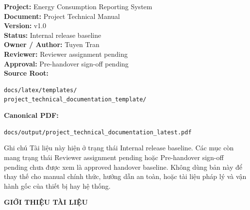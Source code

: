 \documentclass[12pt,oneside,openany]{book}
\numberwithin{equation}{chapter}
\newcommand{\ProjectName}{Energy Consumption Reporting System}
\newcommand{\DocumentShortTitle}{Project Technical Manual}
\newcommand{\DocumentVersionLabel}{v1.0}
\newcommand{\DocumentStatusLabel}{Internal release baseline}
\newcommand{\DocumentOwnerLabel}{Tuyen Tran}
\newcommand{\DocumentReviewerLabel}{Reviewer assignment pending}
\newcommand{\DocumentApprovalLabel}{Pre-handover sign-off pending}
\newcommand{\DocumentOutputPathDisplay}{\nolinkurl{docs/output/project_technical_documentation_latest.pdf}}
\begin{document}
	\begin{center}
		\begin{tcolorbox}[
			width=0.92\textwidth,
			colback=white,
			colframe=BrandBlue,
			arc=6mm,
			boxrule=0.8pt
			]
			\textbf{Project:} \ProjectName\\[4pt]
			\textbf{Document:} \DocumentShortTitle\\[4pt]
			\textbf{Version:} \DocumentVersionLabel\\[4pt]
			\textbf{Status:} \DocumentStatusLabel\\[4pt]
			\textbf{Owner / Author:} \DocumentOwnerLabel\\[4pt]
			\textbf{Reviewer:} \DocumentReviewerLabel\\[4pt]
			\textbf{Approval:} \DocumentApprovalLabel\\[6pt]
			\textbf{Source Root:}\\[-1pt]
			{\raggedright\small \nolinkurl{docs/latex/templates/}\\\nolinkurl{project_technical_documentation_template/}\par}
			\vspace{4pt}
			\textbf{Canonical PDF:}\\[-1pt]
			{\raggedright\small \DocumentOutputPathDisplay\par}
		\end{tcolorbox}
	\end{center}
	
	\vspace{14pt}
	
	\begin{center}
		\begin{DocBannerNote}[fontupper=\fontsize{11}{14}\selectfont, top=10pt, bottom=10pt]{Ghi chú}
			Tài liệu này hiện ở trạng thái \DocumentStatusLabel. Các mục còn mang trạng thái \DocumentReviewerLabel{} hoặc \DocumentApprovalLabel{} chưa được xem là approved handover baseline. Không dùng bản này để thay thế cho manual chính thức, hướng dẫn an toàn, hoặc tài liệu pháp lý và vận hành gốc của thiết bị hay hệ thống.
		\end{DocBannerNote}
	\end{center}
	
	\clearpage
	
	\thispagestyle{empty}
	\begin{center}
		{\fontsize{15}{18}\selectfont\bfseries GIỚI THIỆU TÀI LIỆU}
	\end{center}
	
\end{document}
